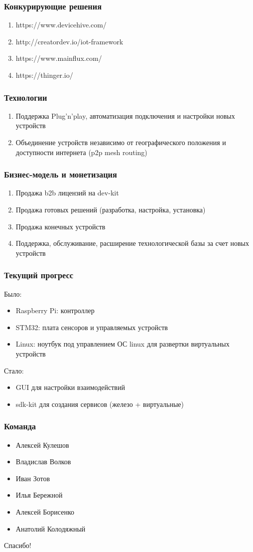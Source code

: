 \documentclass[14pt]{beamer}
\begin{document}
\begin{frame}
  \frametitle{Конкурирующие решения}
  \begin{enumerate}
    \item https://www.devicehive.com/
    \item http://creatordev.io/iot-framework
    \item https://www.mainflux.com/
    \item https://thinger.io/  
  \end{enumerate}
\end{frame}

\begin{frame}
  \frametitle{Технологии}
  \begin{enumerate}
    \item Поддержка Plug'n'play, автоматизация подключения и
      настройки новых устройств
    \item Объединение устройств независимо от географического
      положения и доступности интернета (p2p mesh routing)
  \end{enumerate}
\end{frame}

\begin{frame}
  \frametitle{Бизнес-модель и монетизация}
  \begin{enumerate}
    \item Продажа b2b лицензий на dev-kit
    \item Продажа готовых решений (разработка, настройка, установка)
    \item Продажа конечных устройств
    \item Поддержка, обслуживание, расширение технологической
      базы за счет новых устройств
  \end{enumerate}
\end{frame}

\begin{frame}
  \frametitle{Текущий прогресс}
  Было:
  \begin{itemize}
    \item Raspberry Pi: контроллер
    \item STM32: плата сенсоров и управляемых устройств
    \item Linux: ноутбук под управлением ОС linux для развертки
      виртуальных устройств
  \end{itemize}

  Стало:
  \begin{itemize}
    \item GUI для настройки взаимодействий
    \item sdk-kit для создания сервисов (железо + виртуальные)
  \end{itemize}
\end{frame}

\begin{frame}
  \frametitle{Команда}
  \begin{itemize}
    \item Алексей Кулешов
    \item Владислав Волков
    \item Иван Зотов
    \item Илья Бережной
    \item Алексей Борисенко
    \item Анатолий Колодяжный
  \end{itemize}
  \vfill
  \centerline{Спасибо!}
\end{frame}
\end{document}
